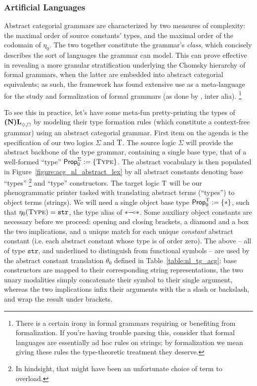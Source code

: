 \subsubsection{Artificial Languages}
\label{subsubsection:acg_artificial}
Abstract categorial grammars are characterized by two measures of complexity: the maximal order of source constants' types, and the maximal order of the codomain of $\eta_0$.
The two together constitute the grammar's \textit{class}, which concisely describes the sort of languages the grammar can model.
This can prove effective in revealing a more granular stratification underlying the Chomsky hierarchy of formal grammars, when the latter are embedded into abstract categorial equivalents; as such, the framework has found extensive use as a meta-language for the study and formalization of formal grammars (as done by \citet{de2004expressive}, inter alia).
\footnote{There is a certain irony in formal grammars requiring or benefiting from formalization. If you're having trouble parsing this, consider that formal languages are essentially ad hoc rules on strings; by formalization we mean giving these rules the type-theoretic treatment they deserve.}

To see this in practice, let's have some meta-fun pretty-printing the types of $\logic{(N)L}_{\diamond, \bx}$ by modeling their type formation rules (which constitute a context-free grammar) using an abstract categorial grammar.
First item on the agenda is the specification of our two logics $\Sigma$ and $\mathrm{T}$.
The source logic $\Sigma$ will provide the abstract backbone of the type grammar, containing a single base type, that of a well-formed ``type'' 
$\propcon^{\Sigma} := \{ \type[s] \}$.
The abstract vocabulary is then populated in Figure~\ref{figure:acg_nl_abstract_lex} by all abstract constants denoting base ``types''%
\footnote{In hindsight, that might have been an unfortunate choice of term\textsuperscript{\thefootnote} to overload.} and ``type'' constructors.
The target logic $\mathrm{T}$ will be our phenogrammatic printer tasked with translating abstract terms (``types'') to object terms (strings).
We will need a single object base type  $\mathsf{Prop}_0^{\mathrm{T}} := \{ * \}$, such that $\eta_0(\type[s]) = \mathtt{str}$, the type alias of $*\li *$.
Some auxiliary object constants are necessary before we proceed: opening and closing brackets, a diamond and a box the two implications, and a unique match for each unique \textit{constant} abstract constant (i.e. each abstract constant whose type is of order zero).
The above -- all of type $\mathtt{str}$, and underlined to distinguish from functional symbols -- are used by the abstract constant translation $\theta_0$ defined in Table~\ref{table:nl_tg_acg}: base constructors are mapped to their corresponding string representations, the two unary modalities simply concatenate their symbol to their single argument, whereas the two implications infix their arguments with the a slash or backslash, and wrap the result under brackets.

